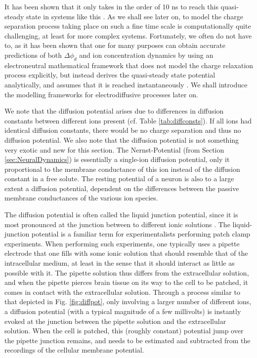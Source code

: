 It has been shown that it only takes in the order of 10 ns to reach this quasi-steady state in systems like this \cite{Solbra2018}. As we shall see later on, to model the charge separation process taking place on such a fine time scale is computationally quite challenging, at least for more complex systems. Fortunately, we often do not have to, as it has been shown that one for many purposes can obtain accurate predictions of both $\Delta \phi_d$ and ion concentration dynamics by using an electroneutral mathematical framework that does not model the charge relaxation process explicitly, but instead derives the quasi-steady state potential analytically, and assumes that it is reached instantaneously \cite{Solbra2018}. We shall introduce the modelling frameworks for electrodiffusive processes later on.

We note that the diffusion potential arises due to differences in diffusion constants between different ions present  (cf. Table \ref{tab:diffconsts}). If all ions had identical diffusion constants, there would be no charge separation and thus no diffusion potential. We also note that the diffusion potential is not something very exotic and new for this section. The Nernst-Potential (from Section \ref{sec:NeuralDynamics}) is essentially a single-ion diffusion potential, only it proportional to the membrane conductance of this ion instead of the diffusion constant in a free solute. The resting potential of a neuron is also to a large extent a diffusion potential, dependent on the differences between the passive membrane conductances of the various ion species.

The diffusion potential is often called the liquid junction potential, since it is most pronounced at the junction between to different ionic solutions \cite{Sokalski2001}. The liquid-junction potential is a familiar term for experimentalists performing patch clamp experiments. When performing such experiments, one typically uses a pipette electrode that one fills with some ionic solution that should resemble that of the intracellular medium, at least in the sense that it should interact as little as possible with it. The pipette solution thus differs from the extracellular solution, and when the pipette pierces brain tissue on its way to the cell to be patched, it comes in contact with the extracellular solution. Through a process similar to that depicted in Fig. \ref{fig:diffpot}, only involving a larger number of different ions, a diffusion potential (with a typical magnitude of a few millivolts) is instantly evoked at the junction between the pipette solution and the extracellular solution. When the cell is patched, this (roughly constant) potential jump over the pipette junction remains, and needs to be estimated and subtracted from the recordings of the cellular membrane potential.

